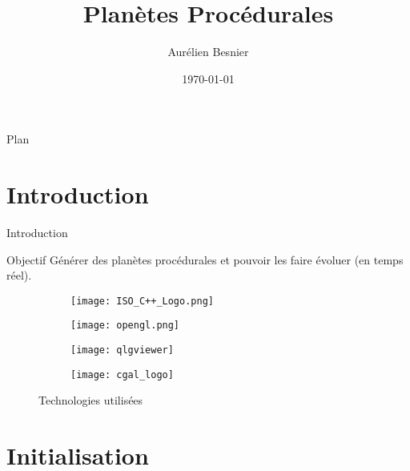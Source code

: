 \documentclass{beamer}
\title{Planètes Procédurales}
\institute{Master 2 IMAGINE}
\author[A. Besnier]{Aurélien Besnier}
\date{\today}
\begin{document}
\maketitle

\begin{frame}{Plan}
    \tableofcontents
\end{frame}

\section{Introduction}

\begin{frame}{Introduction}

\begin{block}{Objectif}
Générer des planètes procédurales et pouvoir les faire évoluer (en temps réel).
\end{block}
\begin{figure}[H]
        \begin{subfigure}[b]{0.25\textwidth}
                \centering
                \texttt{[image: ISO\_C++\_Logo.png]}
        \end{subfigure}%
        \begin{subfigure}[b]{0.25\textwidth}
                \centering
                \texttt{[image: opengl.png]}
        \end{subfigure}%
        \begin{subfigure}[b]{0.25\textwidth}
                \centering
                \texttt{[image: qlgviewer]}
        \end{subfigure}%
        \begin{subfigure}[b]{0.25\textwidth}
                \centering
                \texttt{[image: cgal\_logo]}
        \end{subfigure}
        \caption{Technologies utilisées}
\end{figure}
    
\end{frame}


\section{Initialisation}
\end{document}
